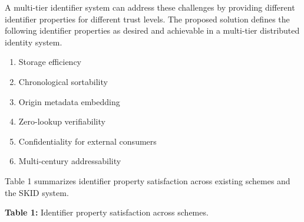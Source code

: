 \documentclass[fleqn,10pt]{wlpeerj}
\providecommand{\tightlist}{%
  \setlength{\itemsep}{0pt}\setlength{\parskip}{0pt}}
\begin{document}
A multi-tier identifier system can address these challenges by providing
different identifier properties for different trust levels. The proposed
solution defines the following identifier properties as desired and
achievable in a multi-tier distributed identity system.

\begin{enumerate}
\def\labelenumi{\arabic{enumi}.}
\tightlist
\item
  Storage efficiency
\item
  Chronological sortability
\item
  Origin metadata embedding
\item
  Zero-lookup verifiability
\item
  Confidentiality for external consumers
\item
  Multi-century addressability
\end{enumerate}

Table 1 summarizes identifier property satisfaction across existing
schemes and the SKID system.

\textbf{Table 1:} Identifier property satisfaction across schemes.
\end{document}
